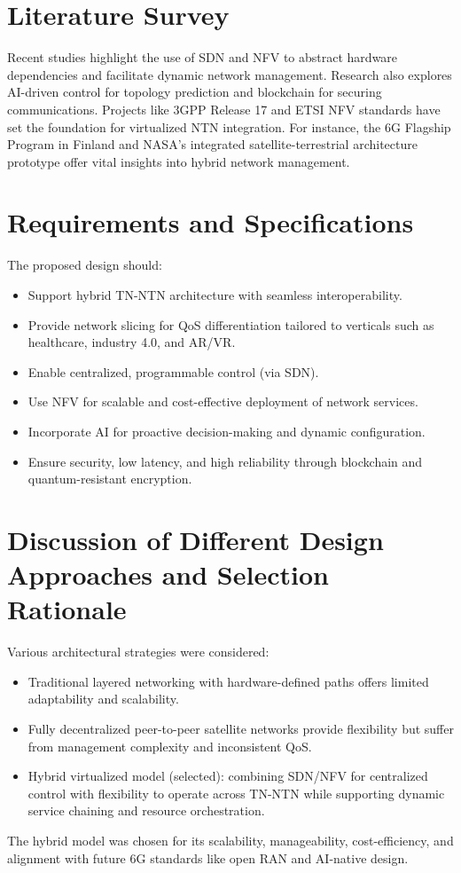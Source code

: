 \documentclass[a4paper,12pt]{article}
\begin{document}
\section{Literature Survey}
Recent studies highlight the use of SDN and NFV to abstract hardware dependencies and facilitate dynamic network management. Research also explores AI-driven control for topology prediction and blockchain for securing communications. Projects like 3GPP Release 17 and ETSI NFV standards have set the foundation for virtualized NTN integration. For instance, the 6G Flagship Program in Finland and NASA's integrated satellite-terrestrial architecture prototype offer vital insights into hybrid network management.

\section{Requirements and Specifications}
The proposed design should:
\begin{itemize}[noitemsep]
    \item Support hybrid TN-NTN architecture with seamless interoperability.
    \item Provide network slicing for QoS differentiation tailored to verticals such as healthcare, industry 4.0, and AR/VR.
    \item Enable centralized, programmable control (via SDN).
    \item Use NFV for scalable and cost-effective deployment of network services.
    \item Incorporate AI for proactive decision-making and dynamic configuration.
    \item Ensure security, low latency, and high reliability through blockchain and quantum-resistant encryption.
\end{itemize}

\section{Discussion of Different Design Approaches and Selection Rationale}
Various architectural strategies were considered:
\begin{itemize}[noitemsep]
    \item Traditional layered networking with hardware-defined paths offers limited adaptability and scalability.
    \item Fully decentralized peer-to-peer satellite networks provide flexibility but suffer from management complexity and inconsistent QoS.
    \item Hybrid virtualized model (selected): combining SDN/NFV for centralized control with flexibility to operate across TN-NTN while supporting dynamic service chaining and resource orchestration.
\end{itemize}
The hybrid model was chosen for its scalability, manageability, cost-efficiency, and alignment with future 6G standards like open RAN and AI-native design.
\end{document}
